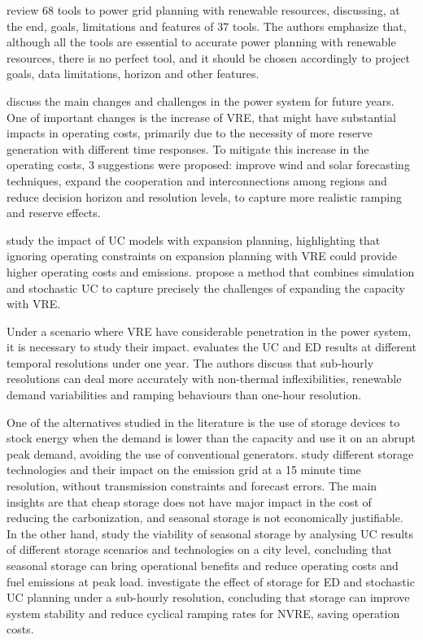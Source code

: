 \documentclass[12pt,LUDisStyle,twosided]{book}
\begin{document}
\citeauthor{connolly} \cite{connolly} review 68 tools to power grid planning with renewable resources, discussing, at the end, goals, limitations and features of 37 tools. The authors emphasize that, although all the tools are essential to accurate power planning with renewable resources, there is no perfect tool, and it should be chosen accordingly to project goals, data limitations, horizon and other features. 


\citeauthor{kassakian} \cite{kassakian} discuss the main changes and challenges in the power system for future years. One of important changes is the increase of VRE, that might have substantial impacts in operating costs, primarily due to the necessity of more reserve generation with different time responses. To mitigate this increase in the operating costs, 3 suggestions were proposed: improve wind and solar forecasting techniques, expand the cooperation and interconnections among regions and reduce decision horizon and resolution levels, to capture more realistic ramping and reserve effects.

\citeauthor{palmintier} \cite{palmintier} study the impact of UC models with expansion planning, highlighting that ignoring operating constraints on expansion planning with VRE could provide higher operating costs and emissions. \citeauthor{hargreaves}  \cite{hargreaves} propose a method that combines simulation and stochastic UC to capture precisely the challenges of expanding the capacity with VRE.

Under a scenario where VRE have considerable penetration in the power system, it is necessary to study their impact. \citeauthor{deane} \cite{deane} evaluates the UC and ED results at different temporal resolutions under one year. The authors discuss that sub-hourly resolutions can deal more accurately with non-thermal inflexibilities, renewable demand variabilities and ramping behaviours than one-hour resolution. 

One of the alternatives studied in the literature is the use of storage devices to stock energy when the demand is lower than the capacity and use it on an abrupt peak demand, avoiding the use of conventional generators.  \citeauthor{safaei} \cite{safaei} study different storage technologies and their impact on the emission grid at a 15 minute time resolution, without transmission constraints and forecast errors. The main insights are that cheap storage does not have major impact in the cost of reducing the carbonization, and seasonal storage is not economically justifiable. In the other hand, \citeauthor{harris} \cite{harris} study the viability of seasonal storage by analysing UC results of different storage scenarios and technologies on a city level, concluding that seasonal storage can bring operational benefits and reduce operating costs and fuel emissions at peak load. \citeauthor{dwyer} \cite{dwyer} investigate the effect of storage for ED and stochastic UC planning under a sub-hourly resolution, concluding that storage can improve system stability and reduce cyclical ramping rates for NVRE, saving operation costs. 
\end{document}
